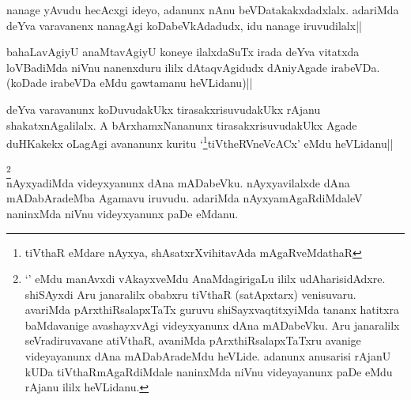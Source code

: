 \begin{artha}
nanage yAvudu hecAcxgi ideyo, adanunx nAnu beVDatakakxdadxlalx. 
adariMda deYva varavanenx nanagAgi koDabeVkAdadudx, idu nanage 
iruvudilalx||
\end{artha}


\begin{artha}
bahaLavAgiyU anaMtavAgiyU koneye ilalxdaSuTx irada deYva vitatxda 
loVBadiMda niVnu nanenxduru ililx dAtaqvAgidudx dAniyAgade irabeVDa. 
(koDade irabeVDa eMdu gawtamanu heVLidanu)||
\end{artha}


\begin{artha}
deYva varavanunx koDuvudakUkx tirasakxrisuvudakUkx rAjanu 
shakatxnAgalilalx. A bArxhamxNananunx tirasakxrisuvudakUkx Agade 
duHKakekx oLagAgi avananunx kuritu `\footnote[1]{tiVthaR eMdare 
nAyxya, shAsatxrXvihitavAda mAgaRveMdathaR}tiVtheRVneVcACx' eMdu heVLidanu||
\end{artha}


\begin{artha}
\footnote[2]{`\stext' eMdu manAvxdi vAkayxveMdu AnaMdagirigaLu ililx 
udAharisidAdxre. shiSAyxdi Aru janaralilx obabxru tiVthaR (satApxtarx) 
venisuvaru. avariMda pArxthiRsalapxTaTx guruvu shiSayxvaqtitxyiMda 
tananx hatitxra baMdavanige avashayxvAgi videyxyanunx dAna mADabeVku. 
Aru janaralilx seVradiruvavane atiVthaR, avaniMda pArxthiRsalapxTaTxru 
avanige videyayanunx dAna mADabAradeMdu heVLide. adanunx anusarisi 
rAjanU kUDa tiVthaRmAgaRdiMdale naninxMda niVnu videyayanunx paDe eMdu 
rAjanu ililx heVLidanu.}\\
nAyxyadiMda videyxyanunx dAna mADabeVku. nAyxyavilalxde dAna 
mADabAradeMba Agamavu iruvudu. adariMda nAyxyamAgaRdiMdaleV naninxMda 
niVnu videyxyanunx paDe eMdanu.
\end{artha}



